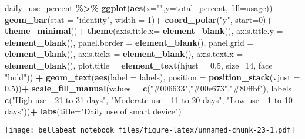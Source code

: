 \documentclass[
]{article}
\newenvironment{Shaded}{\begin{snugshade}}{\end{snugshade}}
\newcommand{\AttributeTok}[1]{\textcolor[rgb]{0.13,0.29,0.53}{#1}}
\newcommand{\DecValTok}[1]{\textcolor[rgb]{0.00,0.00,0.81}{#1}}
\newcommand{\FloatTok}[1]{\textcolor[rgb]{0.00,0.00,0.81}{#1}}
\newcommand{\FunctionTok}[1]{\textcolor[rgb]{0.13,0.29,0.53}{\textbf{#1}}}
\newcommand{\NormalTok}[1]{#1}
\newcommand{\SpecialCharTok}[1]{\textcolor[rgb]{0.81,0.36,0.00}{\textbf{#1}}}
\newcommand{\StringTok}[1]{\textcolor[rgb]{0.31,0.60,0.02}{#1}}
\begin{document}
\begin{Shaded}
\begin{Highlighting}[]
\NormalTok{daily\_use\_percent }\SpecialCharTok{\%\textgreater{}\%}
  \FunctionTok{ggplot}\NormalTok{(}\FunctionTok{aes}\NormalTok{(}\AttributeTok{x=}\StringTok{""}\NormalTok{,}\AttributeTok{y=}\NormalTok{total\_percent, }\AttributeTok{fill=}\NormalTok{usage)) }\SpecialCharTok{+}
  \FunctionTok{geom\_bar}\NormalTok{(}\AttributeTok{stat =} \StringTok{"identity"}\NormalTok{, }\AttributeTok{width =} \DecValTok{1}\NormalTok{)}\SpecialCharTok{+}
  \FunctionTok{coord\_polar}\NormalTok{(}\StringTok{"y"}\NormalTok{, }\AttributeTok{start=}\DecValTok{0}\NormalTok{)}\SpecialCharTok{+}
  \FunctionTok{theme\_minimal}\NormalTok{()}\SpecialCharTok{+}
  \FunctionTok{theme}\NormalTok{(}\AttributeTok{axis.title.x=} \FunctionTok{element\_blank}\NormalTok{(),}
        \AttributeTok{axis.title.y =} \FunctionTok{element\_blank}\NormalTok{(),}
        \AttributeTok{panel.border =} \FunctionTok{element\_blank}\NormalTok{(), }
        \AttributeTok{panel.grid =} \FunctionTok{element\_blank}\NormalTok{(), }
        \AttributeTok{axis.ticks =} \FunctionTok{element\_blank}\NormalTok{(),}
        \AttributeTok{axis.text.x =} \FunctionTok{element\_blank}\NormalTok{(),}
        \AttributeTok{plot.title =} \FunctionTok{element\_text}\NormalTok{(}\AttributeTok{hjust =} \FloatTok{0.5}\NormalTok{, }\AttributeTok{size=}\DecValTok{14}\NormalTok{, }\AttributeTok{face =} \StringTok{"bold"}\NormalTok{)) }\SpecialCharTok{+}
  \FunctionTok{geom\_text}\NormalTok{(}\FunctionTok{aes}\NormalTok{(}\AttributeTok{label =}\NormalTok{ labels),}
            \AttributeTok{position =} \FunctionTok{position\_stack}\NormalTok{(}\AttributeTok{vjust =} \FloatTok{0.5}\NormalTok{))}\SpecialCharTok{+}
  \FunctionTok{scale\_fill\_manual}\NormalTok{(}\AttributeTok{values =} \FunctionTok{c}\NormalTok{(}\StringTok{"\#006633"}\NormalTok{,}\StringTok{"\#00e673"}\NormalTok{,}\StringTok{"\#80ffbf"}\NormalTok{),}
                    \AttributeTok{labels =} \FunctionTok{c}\NormalTok{(}\StringTok{"High use {-} 21 to 31 days"}\NormalTok{,}
                                 \StringTok{"Moderate use {-} 11 to 20 days"}\NormalTok{,}
                                 \StringTok{"Low use {-} 1 to 10 days"}\NormalTok{))}\SpecialCharTok{+}
  \FunctionTok{labs}\NormalTok{(}\AttributeTok{title=}\StringTok{"Daily use of smart device"}\NormalTok{)}
\end{Highlighting}
\end{Shaded}

\texttt{[image: bellabeat\_notebook\_files/figure-latex/unnamed-chunk-23-1.pdf]}
\end{document}
